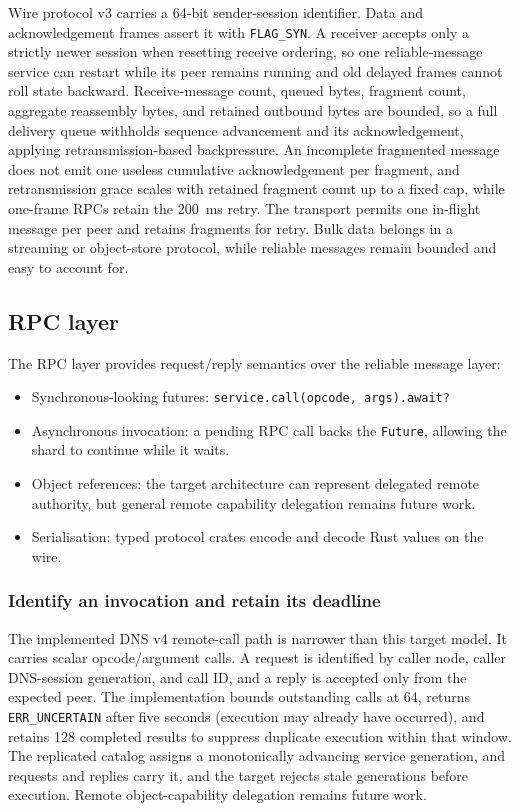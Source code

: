Wire protocol v3 carries a 64-bit sender-session identifier. Data and
acknowledgement frames assert it with \texttt{FLAG\_SYN}. A receiver accepts
only a strictly newer session when resetting receive ordering, so one
reliable-message service can restart while its peer remains running and old
delayed frames cannot roll state backward. Receive-message count, queued
bytes, fragment count, aggregate reassembly bytes, and retained outbound bytes
are bounded, so a full delivery queue withholds sequence advancement and its
acknowledgement, applying retransmission-based backpressure. An incomplete
fragmented message does not emit one useless cumulative acknowledgement per
fragment, and retransmission grace scales with retained fragment count up to a
fixed cap, while one-frame RPCs retain the 200~ms retry. The transport permits one
in-flight message per peer and retains fragments for retry. Bulk data belongs
in a streaming or object-store protocol, while reliable messages remain bounded
and easy to account for.

\subsection{RPC layer}

The RPC layer provides request/reply semantics over the reliable message layer:

\begin{itemize}
    \item Synchronous-looking futures: \texttt{service.call(opcode, args).await?}
    \item Asynchronous invocation: a pending RPC call backs the
        \texttt{Future}, allowing the shard to continue while it waits.
    \item Object references: the target architecture can represent delegated
        remote authority, but general remote capability delegation remains future
        work.
    \item Serialisation: typed protocol crates encode and decode Rust values
        on the wire.
\end{itemize}

\subsubsection{Identify an invocation and retain its deadline}

The implemented DNS v4 remote-call path is narrower than this target model. It
carries scalar opcode/argument calls. A request is identified by
caller node, caller DNS-session generation, and call ID, and a reply is
accepted only from the expected peer. The implementation bounds outstanding
calls at 64, returns \texttt{ERR\_UNCERTAIN} after five seconds (execution may
already have occurred), and retains 128 completed results to suppress duplicate
execution within that window. The replicated catalog assigns a monotonically
advancing service generation, and requests and replies carry it, and the target
rejects stale generations before execution. Remote object-capability
delegation remains future work.

